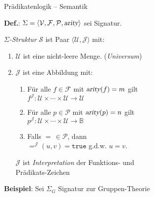 \documentclass{slides}
\newcommand{\struct}{\mathcal{S}}
\begin{document}
\begin{slide}{}
\normalsize
\begin{center}
Prädikatenlogik -- Semantik
\end{center}
\vspace*{0.5cm}

\footnotesize
\textbf{Def.}:   $\Sigma = \langle \mathcal{V}, \mathcal{F}, \mathcal{P},\textsl{arity}\rangle$ sei Signatur. 

\emph{$\Sigma$-Struktur} $\struct$ ist Paar 
 $\langle \mathcal{U}, \mathcal{J} \rangle$ mit:
\begin{enumerate}
    \item $\mathcal{U}$ ist eine nicht-leere Menge. (\emph{Universum})
    \item $\mathcal{J}$ ist eine Abbildung mit:
    \begin{enumerate}
    \item Für alle $f \in \mathcal{F}$ mit $\textsl{arity}(f) = m$ gilt \\[0.3cm]
          \hspace*{1.3cm}
          $f^\mathcal{J}\colon \mathcal{U} \times \cdots \times \mathcal{U} \rightarrow \mathcal{U}$ 
    \item Für alle $p \in \mathcal{P}$ mit $\textsl{arity}(p) = n$ gilt \\[0.3cm]
          \hspace*{1.3cm} 
          $p^\mathcal{J}\colon \mathcal{U} \times \cdots \times \mathcal{U} \rightarrow \mathbb{B}$
    \item Falls  $=\,\in\mathcal{P}$, dann \\[0.1cm]
          \hspace*{1.3cm}  $=^\mathcal{J}(u,v) = \mathtt{true}$ \quad g.d.w. \quad $u = v$. \\[0.1cm]
    \end{enumerate}
    $\mathcal{J}$ ist \emph{Interpretation} der Funktions- und \\[0.1cm]
    \hspace*{0.6cm} Prädikats-Zeichen
\end{enumerate}

\textbf{Beispiel}: Sei $\Sigma_G$ Signatur zur Gruppen-Theorie


\end{slide}
\end{document}
